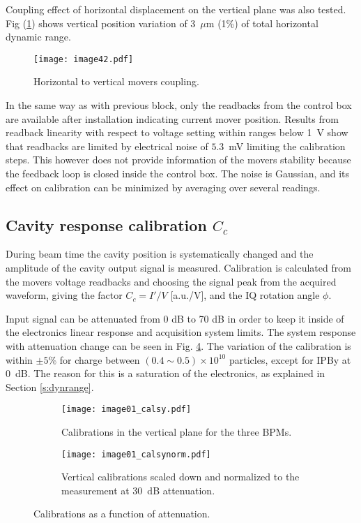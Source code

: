 Coupling effect of horizontal displacement on the vertical plane was also tested. Fig (\ref{f:PIcoupling}) shows vertical position variation of 3~$\mu$m (1\%) of total horizontal dynamic range.\par
\begin{figure}[!htb]
\centering
\texttt{[image: image42.pdf]}\caption{Horizontal to vertical movers coupling.}\label{f:PIcoupling}
\end{figure}
In the same way as with previous block, only the readbacks from the control box are available after installation indicating current mover position. Results from readback linearity with respect to voltage setting within ranges below 1~V show that readbacks are limited by electrical noise of $5.3$~mV limiting the calibration steps. This however does not provide information of the movers stability because the feedback loop is closed inside the control box. The noise is Gaussian, and its effect on calibration can be minimized by averaging over several readings.\par
\subsection{Cavity response calibration $C_c$}\label{s:calibration}
During beam time the cavity position is systematically changed and the amplitude of the cavity output signal is measured. Calibration is calculated from the movers voltage readbacks and choosing the signal peak from the acquired waveform,  giving the factor $C_c=I'/V$ [a.u./V], and the IQ rotation angle $\phi$.\par
Input signal can be attenuated from 0 dB to 70 dB in order to keep it inside of the electronics linear response and acquisition system limits. The system response with attenuation change can be seen in Fig. \ref{f:calatt}. The variation of the calibration is within $\pm5\%$ for charge between $(0.4\sim0.5)\times10^{10}$ particles, except for IPBy at 0~dB. The reason for this is a saturation of the electronics, as explained in Section \ref{s:dynrange}.
\begin{figure}[!htb]
 \centering\hspace*{-0.6cm}
 \begin{subfigure}{0.4\textwidth}
  \texttt{[image: image01\_calsy.pdf]}\caption{Calibrations in the vertical plane for the three BPMs.}\label{f:calsy}
 \end{subfigure}\hspace*{1cm}
\begin{subfigure}{0.4\textwidth}
  \texttt{[image: image01\_calsynorm.pdf]}\caption{Vertical calibrations scaled down and normalized to the measurement at 30~dB attenuation.}\label{f:calsynorm}
 \end{subfigure}\caption{Calibrations as a function of attenuation.}\label{f:calatt}
\end{figure}


